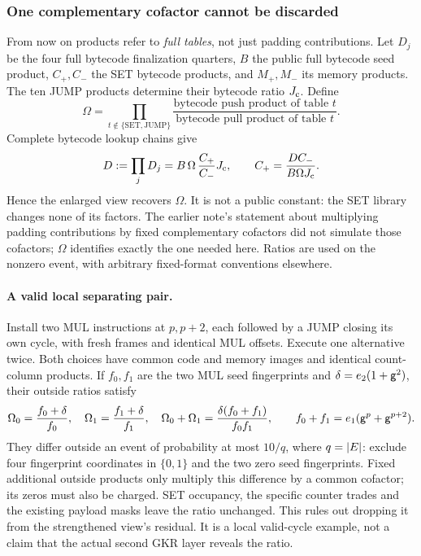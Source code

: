 \subsubsection{One complementary cofactor cannot be discarded}

From now on products refer to \emph{full tables}, not just padding contributions. Let $D_j$ be the four full bytecode finalization quarters, $B$ the public full bytecode seed product, $C_+,C_-$ the SET bytecode products, and $M_+,M_-$ its memory products. The ten JUMP products determine their bytecode ratio $J_{\rm c}$. Define
\[
 \Omega=\prod_{t\notin\{\mathrm{SET},\mathrm{JUMP}\}}
 \frac{\text{bytecode push product of table }t}
      {\text{bytecode pull product of table }t}.
\]
Complete bytecode lookup chains give
\[
 D:=\prod_jD_j=B\,\Omega\,\frac{C_+}{C_-}J_{\rm c},
 \qquad
 C_+=\frac{D C_-}{B\Omega J_{\rm c}}.
\]
Hence the enlarged view recovers $\Omega$. It is not a public constant: the SET library changes none of its factors. The earlier note's statement about multiplying padding contributions by fixed complementary cofactors did not simulate those cofactors; $\Omega$ identifies exactly the one needed here. Ratios are used on the nonzero event, with arbitrary fixed-format conventions elsewhere.

\paragraph{A valid local separating pair.} Install two MUL instructions at $p,p+2$, each followed by a JUMP closing its own cycle, with fresh frames and identical MUL offsets. Execute one alternative twice. Both choices have common code and memory images and identical count-column products. If $f_0,f_1$ are the two MUL seed fingerprints and $\delta=e_2(1+\mathsf{g}^2)$, their outside ratios satisfy
\[
 \Omega_0=\frac{f_0+\delta}{f_0},\quad
 \Omega_1=\frac{f_1+\delta}{f_1},\quad
 \Omega_0+\Omega_1=\frac{\delta(f_0+f_1)}{f_0f_1},
 \qquad f_0+f_1=e_1(\mathsf{g}^p+\mathsf{g}^{p+2}).
\]
They differ outside an event of probability at most $10/q$, where $q=|E|$: exclude four fingerprint coordinates in $\{0,1\}$ and the two zero seed fingerprints. Fixed additional outside products only multiply this difference by a common cofactor; its zeros must also be charged. SET occupancy, the specific counter trades and the existing payload masks leave the ratio unchanged. This rules out dropping it from the strengthened view's residual. It is a local valid-cycle example, not a claim that the actual second GKR layer reveals the ratio.

